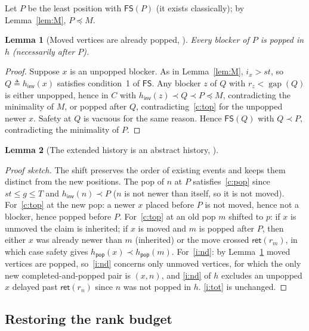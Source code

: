 \documentclass[11pt]{article}
\newtheorem{lemma}{Lemma}[section]
\theoremstyle{definition}
\theoremstyle{remark}
\newcommand{\gap}{\mathop{\mathrm{gap}}}
\newcommand{\code}[1]{\texttt{\detokenize{#1}}}
\newcommand{\FS}{\mathsf{FS}}
\newcommand{\lt}{\prec}
\newcommand{\lte}{\preceq}
\newcommand{\ret}{\mathsf{ret}}
\newcommand{\pop}{\mathsf{pop}}
\newcommand{\inv}{\mathsf{inv}}
\begin{document}
Let \(P\) be the least position with \(\FS(P)\) (it exists classically);
by Lemma~\ref{lem:M}, \(P\lte M\).

\begin{lemma}[Moved vertices are already popped, \code{blocker_popped}]
\label{lem:U}
Every blocker of \(P\) is popped in \(h\) (necessarily after \(P\)).
\end{lemma}

\begin{proof}
Suppose \(x\) is an unpopped blocker.  As in Lemma~\ref{lem:M},
\(i_x>st\), so \(Q\triangleq h_\inv(x)\) satisfies condition~1 of \(\FS\).
Any blocker \(z\) of \(Q\) with \(r_z<\gap(Q)\) is either unpopped, hence in
\(C\) with \(h_\inv(z)\lt Q\lt P\lte M\), contradicting the minimality of
\(M\), or popped after \(Q\), contradicting~\ref{c:top} for the unpopped
newer \(x\).  Safety at \(Q\) is vacuous for the same reason.  Hence
\(\FS(Q)\) with \(Q\lt P\), contradicting the minimality of \(P\).
\end{proof}

\begin{lemma}[The extended history is an abstract history, \code{new_acons}]
\end{lemma}

\begin{proof}[Proof sketch]
The shift preserves the order of existing events and keeps them distinct
from the new positions.  The pop of \(n\) at \(P\) satisfies~\ref{c:pop}
since \(st\le g\le T\) and \(h_\inv(n)\lt P\) (\(n\) is not newer than
itself, so it is not moved).  For~\ref{c:top} at the new pop: a newer \(x\)
placed before \(P\) is not moved, hence not a blocker, hence popped before
\(P\).  For~\ref{c:top} at an old pop \(m\) shifted to \(p\): if \(x\) is
unmoved the claim is inherited; if \(x\) is moved and \(m\) is popped after
\(P\), then either \(x\) was already newer than \(m\) (inherited) or the
move crossed \(\ret(r_m)\), in which case safety gives
\(h_\pop(x)\lt h_\pop(m)\).  For~\ref{i:nd}: by Lemma~\ref{lem:U} moved
vertices are popped, so~\ref{i:nd} concerns only unmoved vertices, for
which the only new completed-and-popped pair is \((x,n)\), and
\ref{i:nd} of \(h\) excludes an unpopped \(x\) delayed past \(\ret(r_n)\)
since \(n\) was not popped in \(h\).  \ref{i:tot} is unchanged.
\end{proof}

\subsection{Restoring the rank budget}
\end{document}

